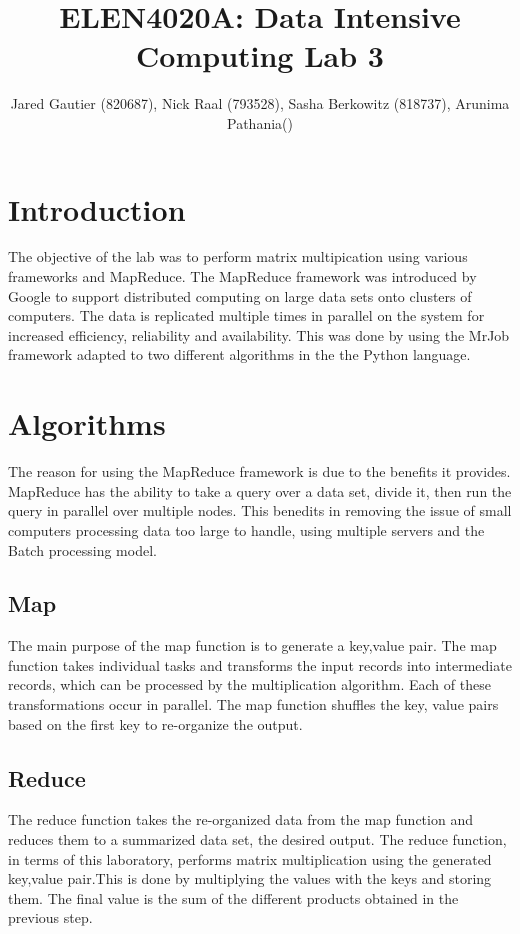 \documentclass[twocolumn]{IEEEtran}
\title{ELEN4020A: Data Intensive Computing Lab 3}
\author{Jared Gautier (820687), Nick Raal (793528), Sasha Berkowitz (818737), Arunima Pathania()}
\begin{document}
	\maketitle
	
	\section{Introduction}
	The objective of the lab was to perform matrix multipication using various frameworks and MapReduce. The MapReduce framework was introduced by Google to support distributed computing on large data sets onto clusters of computers. The data is replicated multiple times in parallel on the system for increased efficiency, reliability and availability. This was done by using the MrJob framework adapted to two different algorithms in the the Python language.
	
	
	\section{Algorithms}
	The reason for using the MapReduce framework is due to the benefits it provides. MapReduce has the ability to take a query over a data set, divide it, then run the query in parallel over multiple nodes. This benedits in removing the issue of small computers processing data too large to handle, using multiple servers and the Batch processing model.
	
	\subsection{Map}
	The main purpose of the map function is to generate a key,value pair.  The map function takes individual tasks and transforms the input records into intermediate records, which can be processed by the multiplication algorithm. Each of these transformations occur in parallel. The map function shuffles the key, value pairs based on the first key to re-organize the output. 
	
	
	
	\subsection{Reduce}
	The reduce function takes the re-organized data from the map function and reduces them to a summarized data set, the desired output. The reduce function, in terms of this laboratory, performs matrix multiplication using the generated key,value pair.This is done by multiplying the values with the keys and storing them. The final value is the sum of the different products obtained in the previous step.
	
\end{document}
